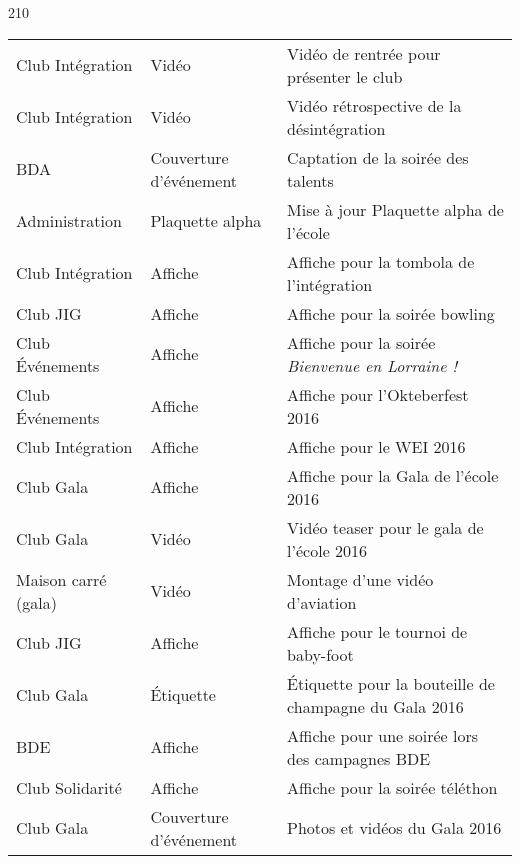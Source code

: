 \begin{textblock}{210}
\begin{center}
\begin{tabular}{|l|l|l|}
		Club Intégration 	& Vidéo 					& Vidéo de rentrée pour présenter le club\\
		Club Intégration 	& Vidéo 					& Vidéo rétrospective de la désintégration\\
		BDA					& Couverture d'événement 	& Captation de la soirée des talents\\
		Administration 		& Plaquette alpha 			& Mise à jour Plaquette alpha de l'école\\
		Club Intégration 	& Affiche					& Affiche pour la tombola de l'intégration\\
		Club JIG 			& Affiche 					& Affiche pour la soirée bowling\\
		Club Événements		& Affiche 					& Affiche pour la soirée \textit{Bienvenue en Lorraine !}\\
		Club Événements 	& Affiche 					& Affiche pour l'Okteberfest 2016\\
		Club Intégration 	& Affiche 					& Affiche pour le WEI 2016\\
		Club Gala 			& Affiche 					& Affiche pour la Gala de l'école 2016\\
		Club Gala 			& Vidéo 					& Vidéo teaser pour le gala de l'école 2016\\
		Maison carré (gala)		& Vidéo						& Montage d'une vidéo d'aviation\\
		Club JIG 			& Affiche					& Affiche pour le tournoi de baby-foot\\
		Club Gala 			& Étiquette 				& Étiquette pour la bouteille de champagne du Gala 2016\\
		BDE 				& Affiche 					& Affiche pour une soirée lors des campagnes BDE\\
		Club Solidarité 	& Affiche 					& Affiche pour la soirée téléthon\\
		Club Gala 			& Couverture d'événement	& Photos et vidéos du Gala 2016\\
	\hline
	\end{tabular}
	\end{center}
\end{textblock}